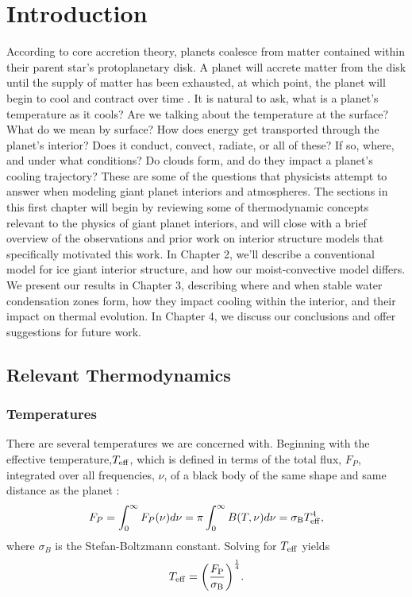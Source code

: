 \documentclass[11pt]{ucscthesisbs}
\begin{document}

\chapter{Introduction}
According to core accretion theory, planets coalesce from matter contained within their parent star's protoplanetary disk. A planet will accrete matter from the disk until the supply of matter has been exhausted, at which point, the planet will begin to cool and contract over time \citep{2007prpl.conf..591L,2013apf..book.....A}. It is natural to ask, what is a planet's temperature as it cools? Are we talking about the temperature at the surface? What do we mean by surface? How does energy get transported through the planet's interior? Does it conduct, convect, radiate, or all of these? If so, where, and under what conditions? Do clouds form, and do they impact a planet's cooling trajectory? These are some of the questions that physicists attempt to answer when modeling giant planet interiors and atmospheres. The sections in this first chapter will begin by reviewing some of thermodynamic concepts relevant to the physics of giant planet interiors, and will close with a brief overview of the observations and prior work on interior structure models that specifically motivated this work. In Chapter 2, we'll describe a conventional model for ice giant interior structure, and how our moist-convective model differs. We present our results in Chapter 3, describing where and when stable water condensation zones form, how they impact cooling within the interior, and their impact on thermal evolution. In Chapter 4, we discuss our conclusions and offer suggestions for future work.

\section{Relevant Thermodynamics}
\subsection{Temperatures}
There are several temperatures we are concerned with. Beginning with the effective temperature,$T_{\rm eff}$, which is defined in terms of the total flux, $F_{P}$, integrated over all frequencies, $\nu$, of a black body of the same shape and same distance as the planet \citep{2010eapp.book.....S}:
\begin{equation}
   F_{P} =  \int_{0}^{\infty} F_{P}(\nu)  d\nu = \pi \int_{0}^{\infty} B(T, \nu) d\nu = \sigma_{\rm B}T_{\rm eff}^{4},
  \label{eq:effective_temp_integral}
\end{equation}  
where $\sigma_{B}$ is the Stefan-Boltzmann constant. Solving for $T_{\rm eff}$ yields
\begin{equation}
    T_{\rm eff} = \bigg(\frac{F_{\rm P}}{\sigma_{\rm B}}\bigg)^{\frac{1}{4}}.
  \label{eq:effective_temp}
\end{equation}
\end{document}
